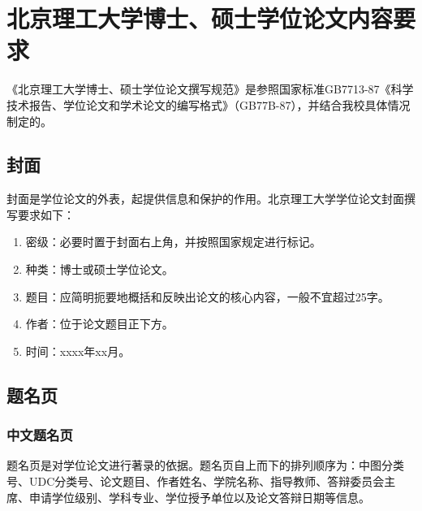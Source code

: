 \chapter{北京理工大学博士、硕士学位论文内容要求}
\label{app:format}
《北京理工大学博士、硕士学位论文撰写规范》是参照国家标准GB7713-87《科学技术报告、学位论文和学术论文的编写格式》（GB77B-87），并结合我校具体情况制定的。

\section{封面}
封面是学位论文的外表，起提供信息和保护的作用。北京理工大学学位论文封面撰写要求如下：

\begin{enumerate}
\item 密级：必要时置于封面右上角，并按照国家规定进行标记。
\item 种类：博士或硕士学位论文。
\item 题目：应简明扼要地概括和反映出论文的核心内容，一般不宜超过25字。
\item 作者：位于论文题目正下方。
\item 时间：xxxx年xx月。
\end{enumerate}

\section{题名页}
\subsection{中文题名页}
题名页是对学位论文进行著录的依据。题名页自上而下的排列顺序为：中图分类号、UDC分类号、论文题目、作者姓名、学院名称、指导教师、答辩委员会主席、申请学位级别、学科专业、学位授予单位以及论文答辩日期等信息。

